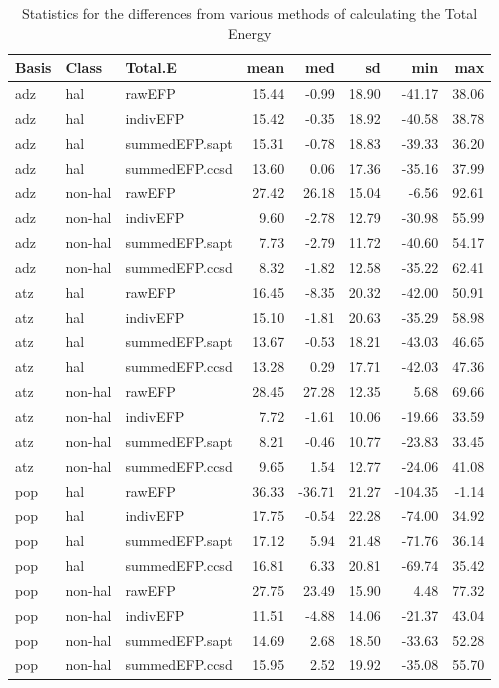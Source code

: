 \begin{table}[ht]
\centering
\footnotesize
\begin{tabular}{lllrrrrr}
  \hline
Basis & Class & Total.E & mean & med & sd & min & max \\ 
  \hline
adz & hal & rawEFP & 15.44 & -0.99 & 18.90 & -41.17 & 38.06 \\ 
  adz & hal & indivEFP & 15.42 & -0.35 & 18.92 & -40.58 & 38.78 \\ 
  adz & hal & summedEFP.sapt & 15.31 & -0.78 & 18.83 & -39.33 & 36.20 \\ 
  adz & hal & summedEFP.ccsd & 13.60 & 0.06 & 17.36 & -35.16 & 37.99 \\ 
  adz & non-hal & rawEFP & 27.42 & 26.18 & 15.04 & -6.56 & 92.61 \\ 
  adz & non-hal & indivEFP & 9.60 & -2.78 & 12.79 & -30.98 & 55.99 \\ 
  adz & non-hal & summedEFP.sapt & 7.73 & -2.79 & 11.72 & -40.60 & 54.17 \\ 
  adz & non-hal & summedEFP.ccsd & 8.32 & -1.82 & 12.58 & -35.22 & 62.41 \\ 
  atz & hal & rawEFP & 16.45 & -8.35 & 20.32 & -42.00 & 50.91 \\ 
  atz & hal & indivEFP & 15.10 & -1.81 & 20.63 & -35.29 & 58.98 \\ 
  atz & hal & summedEFP.sapt & 13.67 & -0.53 & 18.21 & -43.03 & 46.65 \\ 
  atz & hal & summedEFP.ccsd & 13.28 & 0.29 & 17.71 & -42.03 & 47.36 \\ 
  atz & non-hal & rawEFP & 28.45 & 27.28 & 12.35 & 5.68 & 69.66 \\ 
  atz & non-hal & indivEFP & 7.72 & -1.61 & 10.06 & -19.66 & 33.59 \\ 
  atz & non-hal & summedEFP.sapt & 8.21 & -0.46 & 10.77 & -23.83 & 33.45 \\ 
  atz & non-hal & summedEFP.ccsd & 9.65 & 1.54 & 12.77 & -24.06 & 41.08 \\ 
  pop & hal & rawEFP & 36.33 & -36.71 & 21.27 & -104.35 & -1.14 \\ 
  pop & hal & indivEFP & 17.75 & -0.54 & 22.28 & -74.00 & 34.92 \\ 
  pop & hal & summedEFP.sapt & 17.12 & 5.94 & 21.48 & -71.76 & 36.14 \\ 
  pop & hal & summedEFP.ccsd & 16.81 & 6.33 & 20.81 & -69.74 & 35.42 \\ 
  pop & non-hal & rawEFP & 27.75 & 23.49 & 15.90 & 4.48 & 77.32 \\ 
  pop & non-hal & indivEFP & 11.51 & -4.88 & 14.06 & -21.37 & 43.04 \\ 
  pop & non-hal & summedEFP.sapt & 14.69 & 2.68 & 18.50 & -33.63 & 52.28 \\ 
  pop & non-hal & summedEFP.ccsd & 15.95 & 2.52 & 19.92 & -35.08 & 55.70 \\ 
   \hline
\end{tabular}
    \caption{Statistics for the differences from various methods of calculating the Total Energy}
    \label{tab:si.stats.recast}
\end{table}

